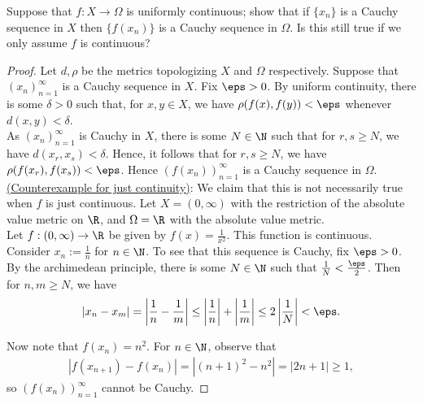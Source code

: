 \documentclass[12pt]{article}
\begin{document}
\begin{homeworkProblem}
  Suppose that $ f:X\to \Omega $ is uniformly continuous; show that if $ \{x_{n}\} $ is a Cauchy sequence in $ X $ then $ \{f(x_{n})\} $ is a Cauchy sequence in $ \Omega $. Is this still true if we only assume $ f $ is continuous?

\begin{proof}
  Let $ d,\rho $ be the metrics topologizing $ X $ and $ \Omega $ respectively.
  Suppose that $ (x_{n})_{n=1}^{\infty} $ is a Cauchy sequence in $ X $. Fix $ \eps>0 $. By uniform continuity, there is some $ \delta>0 $ such that, for $ x,y\in X $, we have $ \rho(f(x),f(y))<\eps $ whenever $ d(x,y)<\delta $.\\

  As $ (x_{n})_{n=1}^{\infty} $ is Cauchy in $ X $, there is some $ N\in \N $ such that for $ r,s\geq N $, we have $ d(x_{r},x_{s})< \delta $. Hence, it follows that for $ r,s\geq N $, we have $ \rho(f(x_{r}), f(x_{s}))<\eps $. Hence $ (f(x_{n}))_{n=1}^{\infty} $ is a Cauchy sequence in $ \Omega $.\\

  \underline{(Counterexample for just continuity)}: We claim that this is not necessarily true when $ f $ is just continuous. Let $ X = (0,\infty) $ with the restriction of the absolute value metric on $ \R $, and $ \Omega = \R $ with the absolute value metric.\\

  Let $ f:(0,\infty)\to \R $ be given by $ f(x) = \frac{1}{x^{2}} $. This function is continuous. Consider $ x_{n} := \frac{1}{n} $ for $ n\in \N $. To see that this sequence is Cauchy, fix $ \eps>0 $. By the archimedean principle, there is some $ N\in \N $ such that $ \frac{1}{N} <\frac{\eps}{2} $. Then  for $ n,m \geq N $, we have 
  \[
    |x_{n}-x_{m}| = \left|\frac{1}{n} - \frac{1}{m}\right| \leq \left|\frac{1}{n}\right| + \left|\frac{1}{m}\right| \leq 2\left|\frac{1}{N}\right| < \eps.
  \]

  Now note that $ f(x_{n}) = n^{2} $. For $ n\in \N $, observe that
  \begin{align*}
    |f(x_{n+1})-f(x_{n})| = |(n+1)^{2}- n^{2}| = |2n+1| \geq 1,
  \end{align*}
  so $ (f(x_{n}))_{n=1}^{\infty} $ cannot be Cauchy.
\end{proof}

\end{homeworkProblem}
\end{document}
